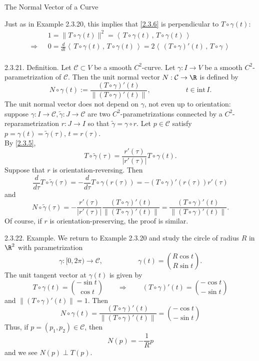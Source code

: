 \documentclass[smaller,hyperref={CJKbookmarks=true}]{beamer}
\newcommand{\scp}[2]{\left\langle\,#1\,,\,#2\,\right\rangle} \newcommand{\scpp}{\langle\,\cdot\,,\,\cdot\,\rangle}
\begin{document}
\begin{frame}{The Normal Vector of a Curve}
\begin{spacing}{1.05}
Just as in Example 2.3.20, this implies that \eqref{2.3.6} is perpendicular to $T\circ\gamma(t)$:
\begin{equation}\label{2.3.7}
  \begin{split}
       &1=\|T\circ\gamma(t)\|^2=\scp{T\circ\gamma(t)}{T\circ\gamma(t)}  \\
     \Rightarrow~~~ &0=\frac{d}{dt}\scp{T\circ\gamma(t)}{T\circ\gamma(t)}
     =2\scp{(T\circ\gamma)'(t)}{T\circ\gamma}
  \end{split}
\end{equation}
 \\[18pt]
\alert{2.3.21. Definition.} Let $\mathcal{C}\subset V$ be a smooth $C^2$-curve. Let $\gamma:I\to V$ be a smooth $C^2$-parametrization of $\mathcal{C}$. Then the unit normal vector $N:\mathcal{C}\to\R$ is defined by
\begin{equation}\label{2.3.8}
  N\circ\gamma(t):=\frac{(T\circ\gamma)'(t)}{\|(T\circ\gamma)'(t)\|},
  \qquad\qquad\quad t\in\text{int}\,I.
\end{equation}
\newpage
The unit normal vector does not depend on $\gamma$, not even up to orientation: suppose $\gamma:I\to\mathcal{C},\widetilde{\gamma}:J\to\mathcal{C}$ are two $C^2$-parametrizations connected by a $C^2$-reparametrization $r:J\to I$ so that $\widetilde{\gamma}=\gamma\circ r$. Let $p\in\mathcal{C}$ satisfy $p=\gamma(t)=\widetilde{\gamma}(\tau),\,
t=r(\tau)$.\\
By \eqref{2.3.5},
\[T\circ\widetilde{\gamma}(\tau)=\frac{r'(\tau)}{|r'(\tau)|}
T\circ\gamma(t).\]
Suppose that $r$ is orientation-reversing. Then
\[\frac{d}{d\tau}T\circ\widetilde{\gamma}(\tau)=-\frac{d}{d\tau}
T\circ\gamma(r(\tau))=-(T\circ\gamma)'(r(\tau))r'(\tau)\]
and
\[N\circ\widetilde{\gamma}(\tau)=-\frac{r'(\tau)}{|r'(\tau)|}
\frac{(T\circ\gamma)'(t)}{\|(T\circ\gamma)'(t)\|}=
\frac{(T\circ\gamma)'(t)}{\|(T\circ\gamma)'(t)\|}.\]
Of course, if $r$ is orientation-preserving, the proof is similar.
\end{spacing}
\newpage
\begin{spacing}{0.4}
\alert{2.3.22. Example.} We return to Example 2.3.20 and study the circle of radius $R$ in $\R^2$ with parametrization
\[\gamma:[0,2\pi)\to\mathcal{C},\qquad\qquad\quad
\gamma(t)=\binom{R\cos t}{R\sin t}.\]
The unit tangent vector at $\gamma(t)$ is given by
\[T\circ\gamma(t)=\binom{-\sin t}{\cos t}\qquad\Rightarrow\qquad(T\circ\gamma)'(t)
=\binom{-\cos t}{-\sin t}\]
and $\|(T\circ\gamma)'(t)\|=1$. Then
\[N\circ\gamma(t)=\frac{(T\circ\gamma)'(t)}{\|(T\circ\gamma)'(t)\|}=\binom{-\cos t}{-\sin t}\]
Thus, if $p=(p_1,p_2)\in\mathcal{C}$, then
\[N(p)=-\frac{1}{R}p\]
and we see $N(p)\perp T(p)$.
\end{spacing}
\end{frame}
\end{document}
